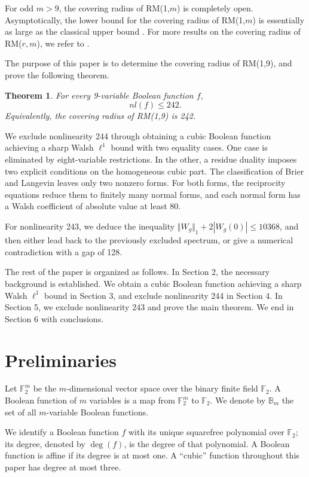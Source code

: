 \documentclass[11pt]{article}
\newtheorem{theorem}{Theorem}
\newtheorem{open problem}{Open problem}
\begin{document}
For odd $m > 9$, the covering
radius of RM(1,$m$) is completely open. Asymptotically, the lower bound for the covering
radius of RM(1,$m$)  is essentially as large as the classical upper bound \cite{Sch}. For more results on the covering radius of RM($r, m$), we refer to \cite{Dough,Elim,Gao0,Gao,Gillot,Wang}.

The purpose of this paper is to determine the covering radius of RM(1,9), and prove the following theorem.
\begin{theorem}\label{thm:main}
For every 9-variable Boolean function $f$,
\begin{equation}\label{eq:main}
nl(f)\le242.
\end{equation}
Equivalently, the covering radius of  RM(1,9) is 242.
\end{theorem}

We exclude nonlinearity 244 through obtaining a cubic Boolean function achieving a sharp Walsh $\ell^1$ bound with two equality cases. One case is eliminated by eight-variable restrictions. In the other, a residue duality imposes two explicit conditions on the homogeneous cubic part. The classification of Brier and Langevin \cite{BrierLangevin,ClassificationData} leaves only two nonzero forms.  For both forms, the
reciprocity equations reduce them to finitely many normal forms,
and each normal form has a Walsh coefficient of absolute value at least 80.

For nonlinearity 243, we deduce the inequality ${\Vert W_g\Vert }_{1}+2|W_g(0)|\le 10368$, and then either lead back to the previously excluded spectrum, or give a numerical contradiction with a gap of 128.

The rest of the paper is organized as follows. In Section 2, the necessary
background is established. We obtain a cubic Boolean function achieving a sharp Walsh $\ell^1$ bound in Section 3, and exclude nonlinearity 244 in Section 4. In Section 5, we exclude nonlinearity 243 and prove the main theorem. We end in Section 6 with conclusions.

\section{Preliminaries}
Let $\mathbb{F}_{2}^{m}$ be the $m$-dimensional vector space over the binary finite field $\mathbb{F}_{2}$. A Boolean function of $m$ variables is a map from $\mathbb{F}_{2}^{m}$ to $\mathbb{F}_{2}$. We denote by $\mathbb{B}_{m}$ the set
of all $m$-variable Boolean functions.

We identify a Boolean function $f$ with its unique squarefree polynomial over $\mathbb{F}_2$; its degree, denoted by $\deg(f)$, is the degree of that polynomial. A Boolean function is affine if its degree is at most one. A ``cubic'' function throughout this paper has degree at most three.
\end{document}
